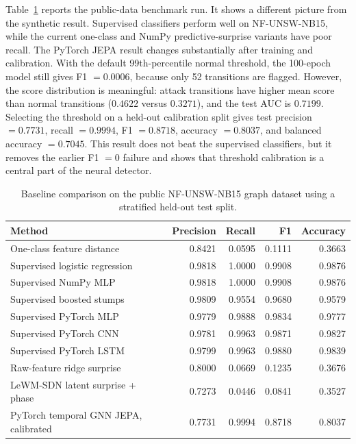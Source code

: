 \documentclass[runningheads]{llncs}
\begin{document}
Table~\ref{tab:publicbaseline} reports the public-data benchmark run. It shows
a different picture from the synthetic result. Supervised classifiers perform
well on NF-UNSW-NB15, while the current one-class and NumPy predictive-surprise
variants have poor recall. The PyTorch JEPA result changes substantially after
training and calibration. With the default 99th-percentile normal threshold,
the 100-epoch model still gives F1 $=0.0006$, because only 52 transitions are
flagged. However, the score distribution is meaningful: attack transitions
have higher mean score than normal transitions ($0.4622$ versus $0.3271$), and
the test AUC is $0.7199$. Selecting the threshold on a held-out calibration
split gives test precision $=0.7731$, recall $=0.9994$, F1 $=0.8718$,
accuracy $=0.8037$, and balanced accuracy $=0.7045$. This result does not beat
the supervised classifiers, but it removes the earlier F1 $=0$ failure and
shows that threshold calibration is a central part of the neural detector.

\begin{table}[t]
\centering
\caption{Baseline comparison on the public NF-UNSW-NB15 graph dataset using a
stratified held-out test split.}
\label{tab:publicbaseline}
\small
\begin{tabular}{p{4.6cm}rrrr}
\toprule
Method & Precision & Recall & F1 & Accuracy \\
\midrule
One-class feature distance & 0.8421 & 0.0595 & 0.1111 & 0.3663 \\
Supervised logistic regression & 0.9818 & 1.0000 & 0.9908 & 0.9876 \\
Supervised NumPy MLP & 0.9818 & 1.0000 & 0.9908 & 0.9876 \\
Supervised boosted stumps & 0.9809 & 0.9554 & 0.9680 & 0.9579 \\
Supervised PyTorch MLP & 0.9779 & 0.9888 & 0.9834 & 0.9777 \\
Supervised PyTorch CNN & 0.9781 & 0.9963 & 0.9871 & 0.9827 \\
Supervised PyTorch LSTM & 0.9799 & 0.9963 & 0.9880 & 0.9839 \\
Raw-feature ridge surprise & 0.8000 & 0.0669 & 0.1235 & 0.3676 \\
LeWM-SDN latent surprise + phase & 0.7273 & 0.0446 & 0.0841 & 0.3527 \\
PyTorch temporal GNN JEPA, calibrated & 0.7731 & 0.9994 & 0.8718 & 0.8037 \\
\bottomrule
\end{tabular}
\end{table}
\end{document}
